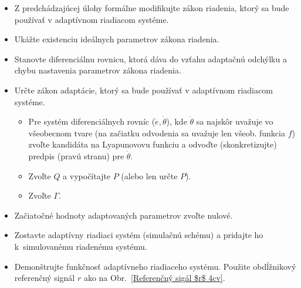 \documentclass[a4paper, 10pt, ]{article}
\begin{document}
\begin{enumerate}[leftmargin=0pt, labelsep=4mm, itemsep=0pt]
    \begin{itemize}[leftmargin=0pt, labelsep=4mm, itemsep=0pt]
    	\item Z predchádzajúcej úlohy formálne modifikujte zákon riadenia, ktorý sa bude používať v adaptívnom riadiacom systéme.
    	\item Ukážte existenciu ideálnych parametrov zákona riadenia. 
    	\item Stanovte diferenciálnu rovnicu, ktorá dáva do vzťahu adaptačnú odchýlku a chybu nastavenia parametrov zákona riadenia. 
    	\item Určte zákon adaptácie, ktorý sa bude používať v adaptívnom riadiacom systéme.
        \begin{itemize}[leftmargin=0pt, labelsep=4mm, itemsep=0pt] 
            \item Pre systém diferenciálnych rovníc ($\dot e, \dot \theta$), kde $\dot \theta$ sa najskôr uvažuje vo všeobecnom tvare (na začiatku odvodenia sa uvažuje len všeob. funkcia $f$) zvoľte kandidáta na Lyapunovovu funkciu a odvoďte (skonkretizujte) predpis (pravú stranu) pre $\dot \theta$.
            \item Zvoľte $Q$ a vypočítajte $P$ (alebo len určte $P$).
        	\item Zvoľte $\Gamma$. 
        \end{itemize}
    	\item Začiatočné hodnoty adaptovaných parametrov zvoľte nulové.
    	\item Zostavte adaptívny riadiaci systém (simulačnú schému) a pridajte ho k~simulovanému riadenému systému. 
    	\item Demonštrujte funkčnosť adaptívneho riadiaceho systému. Použite obdĺžnikový referenčný signál $r$ ako na Obr.~\ref{Referenčný sigál $r$ 4cv}. 

    \end{itemize}


\end{enumerate}
\end{document}

